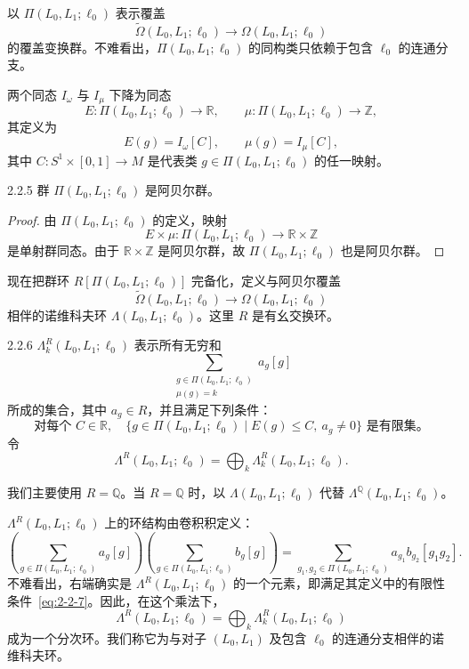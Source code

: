 以 $\Pi(L_0,L_1;\ell_0)$ 表示覆盖
\[
  \widetilde\Omega(L_0,L_1;\ell_0)
  \longrightarrow\Omega(L_0,L_1;\ell_0)
\]
的覆盖变换群。不难看出，$\Pi(L_0,L_1;\ell_0)$ 的同构类只依赖于包含 $\ell_0$ 的连通分支。

两个同态 $I_\omega$ 与 $I_\mu$ 下降为同态
\[
  E:\Pi(L_0,L_1;\ell_0)\longrightarrow\mathbb R,
  \qquad
  \mu:\Pi(L_0,L_1;\ell_0)\longrightarrow\mathbb Z,
\]
其定义为
\[
  E(g)=I_\omega[C],
  \qquad
  \mu(g)=I_\mu[C],
\]
其中 $C:S^1\times[0,1]\to M$ 是代表类
$g\in\Pi(L_0,L_1;\ell_0)$ 的任一映射。

\begin{corollary}{2.2.5}\label{cor:2-2-5}
群 $\Pi(L_0,L_1;\ell_0)$ 是阿贝尔群。
\end{corollary}

\begin{proof}
由 $\Pi(L_0,L_1;\ell_0)$ 的定义，映射
\[
  E\times\mu:\Pi(L_0,L_1;\ell_0)
  \longrightarrow\mathbb R\times\mathbb Z
\]
是单射群同态。由于 $\mathbb R\times\mathbb Z$ 是阿贝尔群，故
$\Pi(L_0,L_1;\ell_0)$ 也是阿贝尔群。
\end{proof}

现在把群环 $R[\Pi(L_0,L_1;\ell_0)]$ 完备化，定义与阿贝尔覆盖
\[
  \widetilde\Omega(L_0,L_1;\ell_0)
  \longrightarrow\Omega(L_0,L_1;\ell_0)
\]
相伴的诺维科夫环 $\Lambda(L_0,L_1;\ell_0)$。这里 $R$ 是有幺交换环。

\begin{definition}{2.2.6}\label{def:2-2-6}
$\Lambda_k^R(L_0,L_1;\ell_0)$ 表示所有无穷和
\[
  \sum_{\substack{g\in\Pi(L_0,L_1;\ell_0)\\\mu(g)=k}}
  a_g[g]
\]
所成的集合，其中 $a_g\in R$，并且满足下列条件：
\begin{equation}
  \text{对每个 }C\in\mathbb R,\quad
  \{g\in\Pi(L_0,L_1;\ell_0)
    \mid E(g)\leq C,\ a_g\neq0\}
  \text{ 是有限集。}
  \tag{2.2.7}\label{eq:2-2-7}
\end{equation}
令
\[
  \Lambda^R(L_0,L_1;\ell_0)
  =\bigoplus_k\Lambda_k^R(L_0,L_1;\ell_0).
\]
\end{definition}

我们主要使用 $R=\mathbb Q$。当 $R=\mathbb Q$ 时，以
$\Lambda(L_0,L_1;\ell_0)$ 代替
$\Lambda^{\mathbb Q}(L_0,L_1;\ell_0)$。

$\Lambda^R(L_0,L_1;\ell_0)$ 上的环结构由卷积积定义：
\[
  \left(\sum_{g\in\Pi(L_0,L_1;\ell_0)}a_g[g]\right)
  \left(\sum_{g\in\Pi(L_0,L_1;\ell_0)}b_g[g]\right)
  =\sum_{g_1,g_2\in\Pi(L_0,L_1;\ell_0)}
    a_{g_1}b_{g_2}[g_1g_2].
\]
不难看出，右端确实是 $\Lambda^R(L_0,L_1;\ell_0)$ 的一个元素，即满足其定义中的有限性条件~\eqref{eq:2-2-7}。因此，在这个乘法下，
\[
  \Lambda^R(L_0,L_1;\ell_0)
  =\bigoplus_k\Lambda_k^R(L_0,L_1;\ell_0)
\]
成为一个分次环。我们称它为与对子 $(L_0,L_1)$ 及包含 $\ell_0$ 的连通分支相伴的诺维科夫环。

